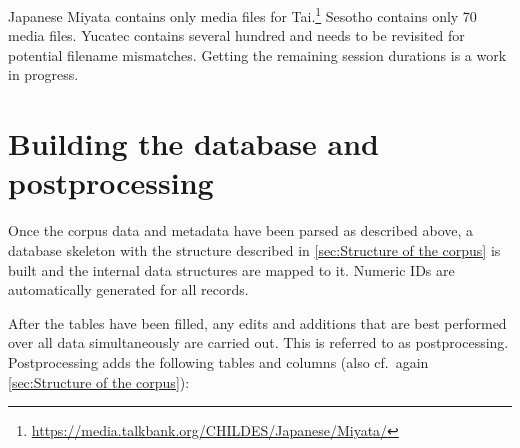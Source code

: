 \documentclass[a4paper, 11pt]{book}
\begin{document}
Japanese Miyata contains only media files for Tai.\footnote{\url{https://media.talkbank.org/CHILDES/Japanese/Miyata/}} Sesotho contains only 70 media files. Yucatec contains several hundred and needs to be revisited for potential filename mismatches. Getting the remaining session durations is a work in progress.


\section{Building the database and postprocessing}
\label{sec:Building the database and postprocessing}

Once the corpus data and metadata have been parsed as described above, a database skeleton with the structure described in \autoref{sec:Structure of the corpus} is built and the internal data structures are mapped to it. Numeric IDs are automatically generated for all records. 

After the tables have been filled, any edits and additions that are best performed over all data simultaneously are carried out. This is referred to as postprocessing. Postprocessing adds the following tables and columns (also cf.\ again \autoref{sec:Structure of the corpus}): 
\end{document}
